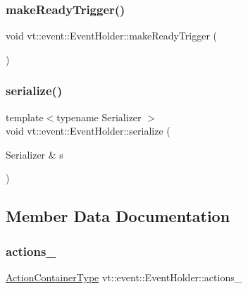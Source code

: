 \subsubsection{\texorpdfstring{make\+Ready\+Trigger()}{makeReadyTrigger()}}
{\footnotesize\ttfamily void vt\+::event\+::\+Event\+Holder\+::make\+Ready\+Trigger (\begin{DoxyParamCaption}{ }\end{DoxyParamCaption})}

\mbox{\label{structvt_1_1event_1_1_event_holder_a20420fda8b6b3165386608e62008ba79}} 
\subsubsection{\texorpdfstring{serialize()}{serialize()}}
{\footnotesize\ttfamily template$<$typename Serializer $>$ \\
void vt\+::event\+::\+Event\+Holder\+::serialize (\begin{DoxyParamCaption}\item[{Serializer \&}]{s }\end{DoxyParamCaption})\hspace{0.3cm}{\ttfamily [inline]}}



\subsection{Member Data Documentation}
\mbox{\label{structvt_1_1event_1_1_event_holder_ab2badf41e04556c851639ea432768560}} 
\subsubsection{\texorpdfstring{actions\+\_\+}{actions\_}}
{\footnotesize\ttfamily \hyperlink{structvt_1_1event_1_1_event_holder_ae0e2d5fe3bd5792118116105a0a09db7}{Action\+Container\+Type} vt\+::event\+::\+Event\+Holder\+::actions\+\_\+\hspace{0.3cm}{\ttfamily [private]}}

